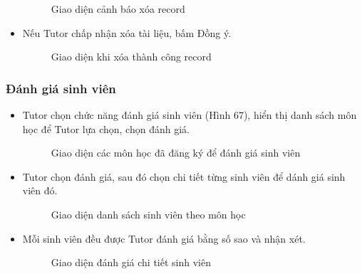 \begin{itemize}
    \begin{figure}[H]
    \centering
    \setlength{\fboxsep}{2pt}     
    \setlength{\fboxrule}{0.5pt}   
    \caption{Giao diện cảnh báo xóa record}
    \end{figure}
    \item Nếu Tutor chấp nhận xóa tài liệu, bấm Đồng ý.
    \begin{figure}[H]
    \centering
    \setlength{\fboxsep}{2pt}     
    \setlength{\fboxrule}{0.5pt}   
    \caption{Giao diện khi xóa thành công record}
    \end{figure}
\end{itemize}
\subsubsection*{Đánh giá sinh viên}
\begin{itemize}
    \item Tutor chọn chức năng đánh giá sinh viên (Hình 67), hiển thị danh sách môn học để Tutor lựa chọn, chọn đánh giá. 
    \begin{figure}[H]
    \centering
    \setlength{\fboxsep}{2pt}     
    \setlength{\fboxrule}{0.5pt}   
    \caption{Giao diện các môn học đã đăng ký để đánh giá sinh viên}
    \end{figure}
    \item Tutor chọn đánh giá, sau đó chọn chi tiết từng sinh viên để dánh giá sinh viên đó.
    \begin{figure}[H]
    \centering
    \setlength{\fboxsep}{2pt}     
    \setlength{\fboxrule}{0.5pt}   
    \caption{Giao diện danh sách sinh viên theo môn học}
    \end{figure}
    \item Mỗi sinh viên đều được Tutor đánh giá bằng số sao và nhận xét.
    \begin{figure}[H]
    \centering
    \setlength{\fboxsep}{2pt}     
    \setlength{\fboxrule}{0.5pt}   
    \caption{Giao diện đánh giá chi tiết sinh viên}
    \end{figure}
\end{itemize}